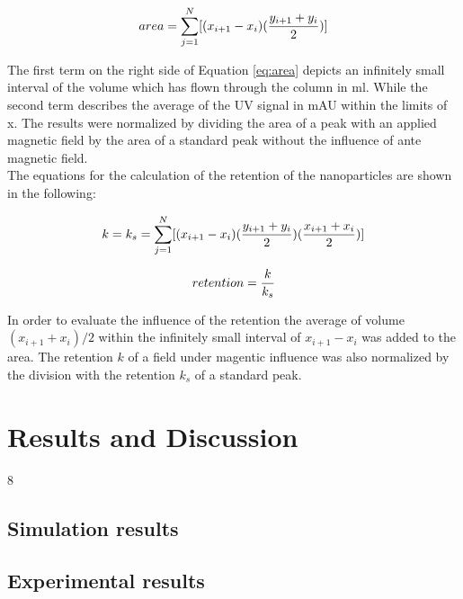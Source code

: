 \begin{equation}
\label{eq:area}
\centering
area = \sum_{j=1}^{N}[(x_{i+1}-x_{i})(\frac{y_{i+1}+y_{i}}{2})]
\end{equation}

The first term on the right side of Equation \ref{eq:area} depicts an infinitely small interval of the volume which has flown through the column in ml. While the second term describes the average of the UV signal in mAU within the limits of x. The results were normalized by dividing the area of a peak with an applied magnetic field by the area of a standard peak without the influence of ante magnetic field. \\


The equations for the calculation of the retention of the nanoparticles are shown in the following: 

\begin{equation}
\label{eq:ret_sum}
\centering
k = k_{s} = \sum_{j=1}^{N}[(x_{i+1}-x_{i})(\frac{y_{i+1}+y_{i}}{2})(\frac{x_{i+1}+x_{i}}{2})]
\end{equation}

\begin{equation}
\label{eq:ret_comp}
\centering
retention = \frac{k}{k_{s}}
\end{equation}

In order to evaluate the influence of the retention the average of volume $(x_{i+1}+x_{i})/2$ within the infinitely small interval of $x_{i+1}-x_{i}$ was added to the area. The retention $k$ of a field under magentic influence was also normalized by the division with the retention $k_{s}$ of a standard peak.   



\chapter{Results and Discussion}8
\label{chap:chap_res}

\section{Simulation results}
\section{Experimental results}

